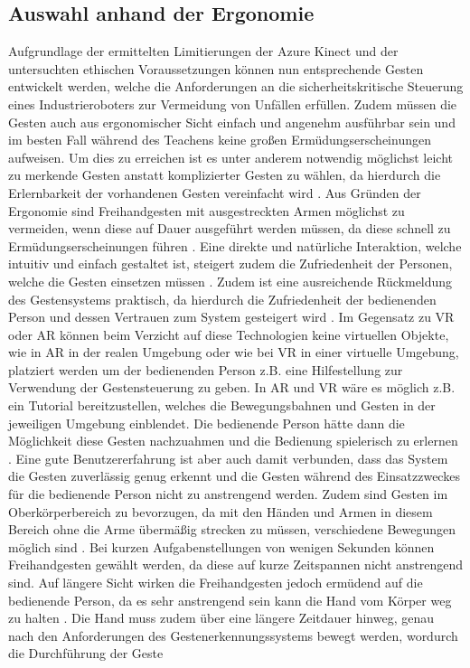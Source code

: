 

\subsection{Auswahl anhand der Ergonomie}
Aufgrundlage der ermittelten Limitierungen der Azure Kinect und der untersuchten ethischen Voraussetzungen können nun entsprechende Gesten entwickelt werden, welche die Anforderungen an die sicherheitskritische Steuerung eines Industrieroboters zur Vermeidung von Unfällen erfüllen. Zudem müssen die Gesten auch aus ergonomischer Sicht einfach und angenehm ausführbar sein und im besten Fall während des Teachens keine großen Ermüdungserscheinungen aufweisen. Um dies zu erreichen ist es unter anderem notwendig möglichst leicht zu merkende Gesten anstatt komplizierter Gesten zu wählen, da hierdurch die Erlernbarkeit der vorhandenen Gesten vereinfacht wird \cite[97]{schleicher_einfuhrung_2020}. Aus Gründen der Ergonomie sind Freihandgesten mit ausgestreckten Armen möglichst zu vermeiden, wenn diese auf Dauer ausgeführt werden müssen, da diese schnell zu Ermüdungserscheinungen führen \cite[84]{neupert_naturliche_nodate}. Eine direkte und natürliche Interaktion, welche intuitiv und einfach gestaltet ist, steigert zudem die Zufriedenheit der Personen, welche die Gesten einsetzen müssen \cite[103]{schleicher_einfuhrung_2020}. Zudem ist eine ausreichende Rückmeldung des Gestensystems praktisch, da hierdurch die Zufriedenheit der bedienenden Person und dessen Vertrauen zum System gesteigert wird \cite[132\psq]{schleicher_einfuhrung_2020}. Im Gegensatz zu VR oder AR können beim Verzicht auf diese Technologien keine virtuellen Objekte, wie in AR in der realen Umgebung oder wie bei VR in einer virtuelle Umgebung, platziert werden um der bedienenden Person z.B. eine Hilfestellung zur Verwendung der Gestensteuerung zu geben. In AR und VR wäre es möglich z.B. ein Tutorial bereitzustellen, welches die Bewegungsbahnen und Gesten in der jeweiligen Umgebung einblendet. Die bedienende Person hätte dann die Möglichkeit diese Gesten nachzuahmen und die Bedienung spielerisch zu erlernen \cite{weidenhausen_mobile_2007}. Eine gute Benutzererfahrung ist aber auch damit verbunden, dass das System die Gesten zuverlässig genug erkennt und die Gesten während des Einsatzzweckes für die bedienende Person nicht zu anstrengend werden. Zudem sind Gesten im Oberkörperbereich zu bevorzugen, da mit den Händen und Armen in diesem Bereich ohne die Arme übermäßig strecken zu müssen, verschiedene Bewegungen möglich sind \cite{nowack_pdf_2017}. Bei kurzen Aufgabenstellungen von wenigen Sekunden können Freihandgesten gewählt werden, da diese auf kurze Zeitspannen nicht anstrengend sind. Auf längere Sicht wirken die Freihandgesten jedoch ermüdend auf die bedienende Person, da es sehr anstrengend sein kann die Hand vom Körper weg zu halten \cite{krammling_user_2018}. Die Hand muss zudem über eine längere Zeitdauer hinweg, genau nach den Anforderungen des Gestenerkennungssystems bewegt werden, wordurch die Durchführung der Geste 